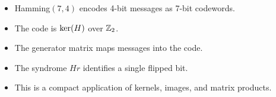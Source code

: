 \begin{itemize}
  \item Hamming$(7,4)$ encodes 4-bit messages as 7-bit codewords.
  \item The code is $\operatorname{ker}(H)$ over $\mathbb{Z}_2$.
  \item The generator matrix maps messages into the code.
  \item The syndrome $Hr$ identifies a single flipped bit.
  \item This is a compact application of kernels, images, and matrix products.
\end{itemize}


